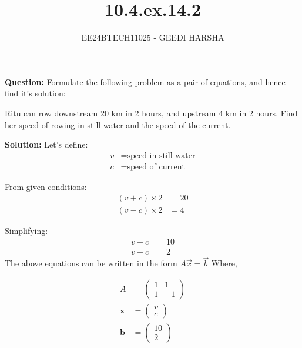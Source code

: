 \documentclass[journal]{IEEEtran}
\begin{document}

\vspace{3cm}
\title{10.4.ex.14.2}
\author{EE24BTECH11025 - GEEDI HARSHA}
{\let\newpage\relax\maketitle}

\renewcommand{\thefigure}{\theenumi}
\renewcommand{\thetable}{\theenumi}
\setlength{\intextsep}{10pt} %


\renewcommand{\thetable}{\theenumi}



\textbf{Question:}
Formulate the following problem as a pair of equations, and hence find it's solution:

Ritu can row downstream 20 km in 2 hours, and upstream 4 km in 2 hours. Find her speed of rowing in still water and the speed of the current.

\textbf{Solution:}
Let's define:
\begin{align*}
v &= \text{speed in still water} \\
c &= \text{speed of current}
\end{align*}

From given conditions:
\begin{align*}
(v + c) \times 2 &= 20 \\
(v - c) \times 2 &= 4
\end{align*}

Simplifying:
\begin{align*}
v + c &= 10 \\
v - c &= 2
\end{align*}
The above equations can be written in the form $A\vec{x} = \vec{b}$
Where,

\begin{align*}
A &= \begin{pmatrix}
    1 & 1 \\
    1 & -1
    \end{pmatrix} \\
\mathbf{x} &= \begin{pmatrix}
    v \\
    c
    \end{pmatrix} \\
\mathbf{b} &= \begin{pmatrix}
    10 \\
    2
    \end{pmatrix}
\end{align*}
\end{document}
